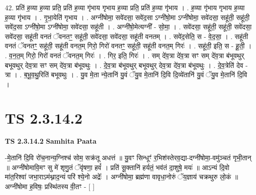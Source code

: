 \documentclass[17pt]{extarticle}
\begin{document}
42. प्रति॑ ह॒व्या ह॒व्या प्रति॒ प्रति॑ ह॒व्या गृ॑भाय गृभाय ह॒व्या प्रति॒ प्रति॑ ह॒व्या गृ॑भाय । . ह॒व्या गृ॑भाय गृभाय ह॒व्या ह॒व्या गृ॑भाय । . गृ॒भा॒येति॑ गृभाय । . अग्नी॑षोमा॒ सवे॑दसा॒ सवे॑द॒सा ऽग्नी॑षो॒मा ऽग्नी॑षोमा॒ सवे॑दसा॒ सहू॑ती॒ सहू॑ती॒ सवे॑द॒सा ऽग्नी॑षो॒मा ऽग्नी॑षोमा॒ सवे॑दसा॒ सहू॑ती । . अग्नी॑षो॒मेत्यग्नी᳚ - सो॒मा॒ । . सवे॑दसा॒ सहू॑ती॒ सहू॑ती॒ सवे॑दसा॒ सवे॑दसा॒ सहू॑ती वनतं ॅवनतꣳ॒॒ सहू॑ती॒ सवे॑दसा॒ सवे॑दसा॒ सहू॑ती वनतम् । . सवे॑द॒सेति॒ स - वे॒द॒सा॒ । . सहू॑ती वनतं ॅवनतꣳ॒॒ सहू॑ती॒ सहू॑ती वनत॒म् गिरो॒ गिरो॑ वनतꣳ॒॒ सहू॑ती॒ सहू॑ती वनत॒म् गिरः॑ । . सहू॑ती॒ इति॒ स - हू॒ती॒ । . व॒न॒त॒म् गिरो॒ गिरो॑ वनतं ॅवनत॒म् गिरः॑ । . गिर॒ इति॒ गिरः॑ । . सम् दे॑व॒त्रा दे॑व॒त्रा सꣳ सम् दे॑व॒त्रा ब॑भूवथुर् बभूवथुर् देव॒त्रा सꣳ सम् दे॑व॒त्रा ब॑भूवथुः । . दे॒व॒त्रा ब॑भूवथुर् बभूवथुर् देव॒त्रा दे॑व॒त्रा ब॑भूवथुः । . दे॒व॒त्रेति॑ देव - त्रा । . ब॒भू॒व॒थु॒रिति॑ बभूवथुः । . यु॒व मे॒ता न्ये॒तानि॑ यु॒वं ॅयु॒व मे॒तानि॑ दि॒वि दि॒व्ये॑तानि॑ यु॒वं ॅयु॒व मे॒तानि॑ दि॒वि । \newline
\pagebreak
{}

\section{ TS 2.3.14.2 }

\textbf{TS 2.3.14.2 } \newline
\textbf{Samhita Paata} \newline

-मे॒तानि॑ दि॒वि रो॑च॒नान्य॒ग्निश्च॑ सोम॒ सक्र॑तू अधत्तं ॥ यु॒वꣳ सिन्धूꣳ॑ र॒भिश॑स्तेरव॒द्या-दग्नी॑षोमा॒-वमु॑ञ्चतं गृभी॒तान् ॥ अग्नी॑षोमावि॒मꣳ सु मे॑ शृणु॒तं ॅवृ॑षणा॒ हवं᳚ । प्रति॑ सू॒क्तानि॑ हर्यतं॒ भव॑तं दा॒शुषे॒ मयः॑ ॥ आऽन्यं दि॒वो मा॑त॒रिश्वा॑ जभा॒राऽम॑थ्नाद॒न्यं परि॑ श्ये॒नो अद्रेः᳚ । अग्नी॑षोमा॒ ब्रह्म॑णा वावृधा॒नोरुं ॅय॒ज्ञाय॑ चक्रथुरु लो॒कं ॥अग्नी॑षोमा ह॒विषः॒ प्रस्थि॑तस्य वी॒तꣳ - [  ] \newline
\end{document}

